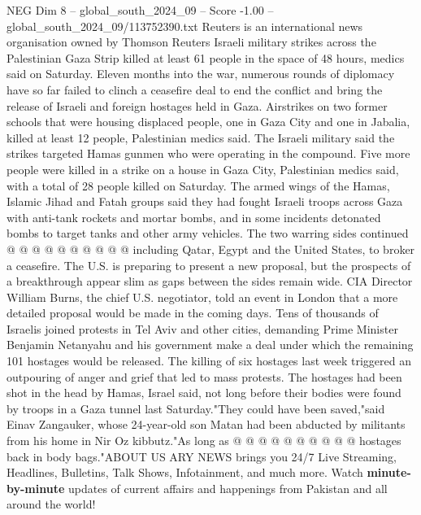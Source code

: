 \begin{textsample}{NEG Dim 8 – global\_south\_2024\_09 – Score -1.00 – global\_south\_2024\_09/113752390.txt}  \label{ex:f8_neg_164}
Reuters is an international news organisation owned by Thomson Reuters Israeli military strikes across the Palestinian Gaza Strip killed at least 61 people in the space of 48 hours, medics said on Saturday.
Eleven months into the war, numerous rounds of diplomacy have so far failed to clinch a ceasefire deal to end the conflict and bring the release of Israeli and foreign hostages held in Gaza.
Airstrikes on two former schools that were housing displaced people, one in Gaza City and one in Jabalia, killed at least 12 people, Palestinian medics said.
The Israeli military said the strikes targeted Hamas gunmen who were operating in the compound.
Five more people were killed in a strike on a house in Gaza City, Palestinian medics said, with a total of 28 people killed on Saturday.
The armed wings of the Hamas, Islamic Jihad and Fatah groups said they had fought Israeli troops across Gaza with anti-tank rockets and mortar bombs, and in some incidents detonated bombs to target tanks and other army vehicles.
The two warring sides continued @ @ @ @ @ @ @ @ @ @ including Qatar, Egypt and the United States, to broker a ceasefire.
The U.S. is preparing to present a new proposal, but the prospects of a breakthrough appear slim as gaps between the sides remain wide.
CIA Director William Burns, the chief U.S. negotiator, told an event in London that a more detailed proposal would be made in the coming days.
Tens of thousands of Israelis joined protests in Tel Aviv and other cities, demanding Prime Minister Benjamin Netanyahu and his government make a deal under which the remaining 101 hostages would be released.
The killing of six hostages last week triggered an outpouring of anger and grief that led to mass protests.
The hostages had been shot in the head by Hamas, Israel said, not long before their bodies were found by troops in a Gaza tunnel last Saturday."They could have been saved,"said Einav Zangauker, whose 24-year-old son Matan had been abducted by militants from his home in Nir Oz kibbutz."As long as @ @ @ @ @ @ @ @ @ @ hostages back in body bags."ABOUT US ARY NEWS brings you 24/7 Live Streaming, Headlines, Bulletins, Talk Shows, Infotainment, and much more.
Watch \textbf{minute-by-minute} updates of current affairs and happenings from Pakistan and all around the world!

\end{textsample}
